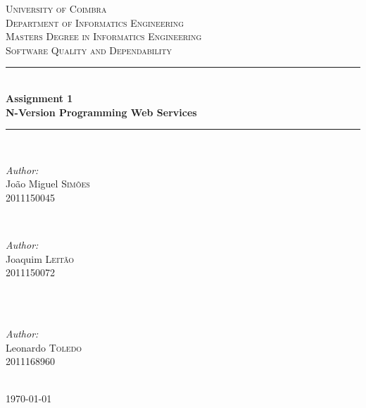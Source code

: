 \begin{titlepage}

\newcommand{\HRule}{\rule{\linewidth}{0.5mm}} 
\center 
 

\textsc{\LARGE University of Coimbra}\\[1cm]
\textsc{\large Department of Informatics Engineering}\\[.5cm]
\textsc{\large Masters Degree in Informatics Engineering}\\[4cm]
\textsc{\large Software Quality and Dependability}\\[1cm]


\HRule \\[0.5cm]
{\huge \bfseries Assignment 1}\\[0.4cm]
{\huge \bfseries N-Version Programming Web Services}\\[0.4cm]
\HRule \\[5cm]
 
\begin{minipage}{0.4\textwidth}
\begin{flushleft} \large
\emph{Author:}\\
João Miguel \textsc{Simões}  \\2011150045
\end{flushleft}
\end{minipage}
~
\begin{minipage}{0.4\textwidth}
\begin{flushright} \large
\emph{Author:} \\
Joaquim \textsc{Leitão}  \\2011150072
\end{flushright}
\end{minipage}\\[2cm]
~
\begin{minipage}{0.3\textwidth}
\begin{flushleft} \large
\emph{Author:} \\
Leonardo \textsc{Toledo}  \\2011168960
\end{flushleft}
\end{minipage}\\[2cm]

{\large \today}\\[3cm]

\vfill

\end{titlepage}